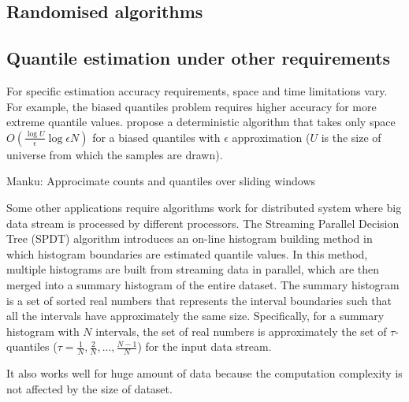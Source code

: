\subsection{Randomised algorithms}
\label{randomised}


\subsection{Quantile estimation under other requirements}
\label{other}
For specific estimation accuracy requirements, space and time limitations vary. For example, the biased quantiles problem requires higher accuracy for more extreme quantile values. \citeauthor{cormodeSpaceTimeefficientDeterministic2006} \cite{cormodeSpaceTimeefficientDeterministic2006} propose a deterministic algorithm that takes only space $O(\frac{\log {U}}{\epsilon} \log {\epsilon N})$ for a biased quantiles with $\epsilon$ approximation ($U$ is the size of universe from which the samples are drawn). 

Manku: Approcimate counts and quantiles over sliding windows

Some other applications require algorithms work for distributed system where big data stream is processed by different processors.
The Streaming Parallel Decision Tree (SPDT) algorithm \cite{ben-haimStreamingParallelDecision} introduces an on-line histogram building method %
in which histogram boundaries are estimated quantile values.
In this method, multiple histograms are built from streaming data in parallel, which are then merged into a summary histogram of the entire dataset. The summary histogram is a set of sorted real numbers that represents the interval boundaries such that all the intervals have approximately the same size. Specifically, for a summary histogram with $N$ intervals, the set of real numbers is approximately the set of $\tau$-quantiles ($\tau = \frac{1}{N}, \frac{2}{N}, ..., \frac{N-1}{N}$) for the input data stream.

 It also works well for huge amount of data because the computation complexity is not affected by the size of dataset.

